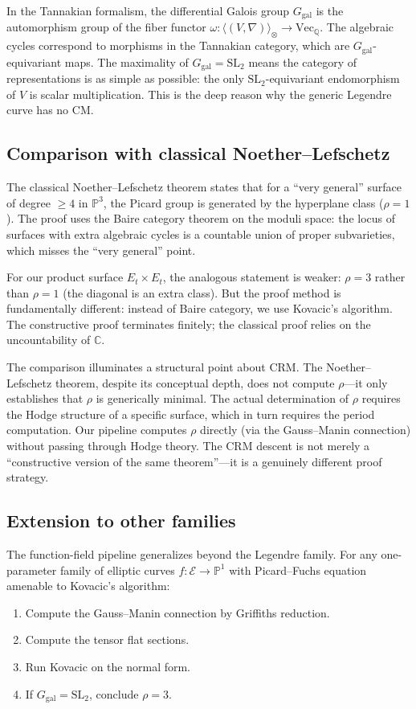 \documentclass[11pt]{article}
\theoremstyle{plain}
\theoremstyle{definition}
\theoremstyle{remark}
\newcommand{\Q}{\mathbb{Q}}
\newcommand{\C}{\mathbb{C}}
\newcommand{\SL}{\mathrm{SL}}
\newcommand{\Ggal}{G_{\mathrm{gal}}}
\begin{document}
In the Tannakian formalism, the differential Galois group $\Ggal$ is the automorphism group of the fiber functor $\omega : \langle (V, \nabla) \rangle_\otimes \to \mathrm{Vec}_\Q$.
The algebraic cycles correspond to morphisms in the Tannakian category, which are $\Ggal$-equivariant maps.
The maximality of $\Ggal = \SL_2$ means the category of representations is as simple as possible: the only $\SL_2$-equivariant endomorphism of $V$ is scalar multiplication.
This is the deep reason why the generic Legendre curve has no CM.

\subsection{Comparison with classical Noether--Lefschetz}

The classical Noether--Lefschetz theorem states that for a ``very general'' surface of degree $\geq 4$ in $\mathbb{P}^3$, the Picard group is generated by the hyperplane class ($\rho = 1$).
The proof uses the Baire category theorem on the moduli space: the locus of surfaces with extra algebraic cycles is a countable union of proper subvarieties, which misses the ``very general'' point.

For our product surface $E_t \times E_t$, the analogous statement is weaker: $\rho = 3$ rather than $\rho = 1$ (the diagonal is an extra class).
But the proof method is fundamentally different: instead of Baire category, we use Kovacic's algorithm.
The constructive proof terminates finitely; the classical proof relies on the uncountability of $\C$.

The comparison illuminates a structural point about CRM.
The Noether--Lefschetz theorem, despite its conceptual depth, does not compute $\rho$---it only establishes that $\rho$ is generically minimal.
The actual determination of $\rho$ requires the Hodge structure of a specific surface, which in turn requires the period computation.
Our pipeline computes $\rho$ directly (via the Gauss--Manin connection) without passing through Hodge theory.
The CRM descent is not merely a ``constructive version of the same theorem''---it is a genuinely different proof strategy.

\subsection{Extension to other families}

The function-field pipeline generalizes beyond the Legendre family.
For any one-parameter family of elliptic curves $f : \mathcal{E} \to \mathbb{P}^1$ with Picard--Fuchs equation amenable to Kovacic's algorithm:
\begin{enumerate}
  \item Compute the Gauss--Manin connection by Griffiths reduction.
  \item Compute the tensor flat sections.
  \item Run Kovacic on the normal form.
  \item If $\Ggal = \SL_2$, conclude $\rho = 3$.
\end{enumerate}
\end{document}
